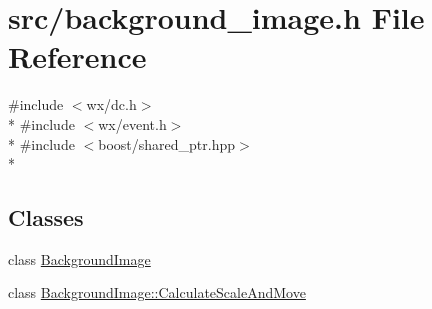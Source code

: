 \hypertarget{a00175}{\section{src/background\-\_\-image.h File Reference}
\label{a00175}
}
{\ttfamily \#include $<$wx/dc.\-h$>$}\\*
{\ttfamily \#include $<$wx/event.\-h$>$}\\*
{\ttfamily \#include $<$boost/shared\-\_\-ptr.\-hpp$>$}\\*
\subsection*{Classes}
\begin{DoxyCompactItemize}
\item 
class \hyperlink{a00017}{Background\-Image}
\item 
class \hyperlink{a00026}{Background\-Image\-::\-Calculate\-Scale\-And\-Move}
\end{DoxyCompactItemize}

